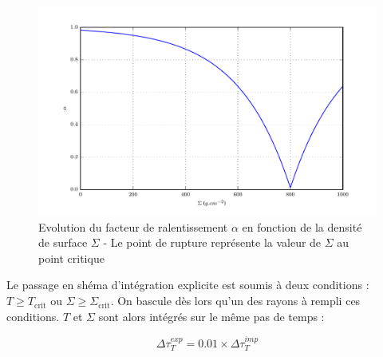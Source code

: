 \begin{figure}
  \includegraphics{figures/alpha_fonction_de_sigma.pdf}
  \caption{Evolution du facteur de ralentissement $\alpha$ en fonction de la densité de surface $\Sigma$ - Le point de rupture représente la valeur de $\Sigma$ au point critique}
  \label{fig::alpha_fct_sig}
\end{figure}

Le passage en shéma d'intégration explicite est soumis à deux conditions : $T
\ge T_\textrm{crit}$ ou $\Sigma \ge \Sigma_\textrm{crit}$. On bascule dès lors
qu'un des rayons à rempli ces conditions. $T$ et $\Sigma$ sont alors intégrés
sur le même pas de temps :

\begin{equation}
\Delta \tau_{T}^{exp} = 0.01 \times \Delta \tau_{T}^{imp}
\end{equation}
